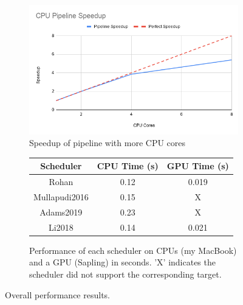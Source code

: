 \documentclass{article}
\begin{document}
\begin{figure}
    \begin{subfigure}{0.5\textwidth}
        \includegraphics[width=\textwidth]{cpu_speedup}
        \caption{Speedup of pipeline with more CPU cores}
        \label{fig:speedup}
    \end{subfigure}
    \begin{subfigure}{0.5\textwidth}
        \centering
        \begin{tabular}{|c|c|c|}
            \hline
            Scheduler & CPU Time (s) & GPU Time (s) \\ 
            \hline
            Rohan & 0.12 & 0.019 \\
            \hline
            Mullapudi2016 & 0.15 & X \\
            \hline
            Adams2019 & 0.23 & X \\
            \hline
            Li2018 & 0.14 & 0.021 \\
            \hline
        \end{tabular}
        \caption{Performance of each scheduler on CPUs (my MacBook) and a GPU (Sapling) in seconds. 'X' indicates the scheduler did not support the corresponding target.}
        \label{fig:table}
    \end{subfigure}
    \caption{Overall performance results.}
    \label{fig:results}
\end{figure}


\end{document}

